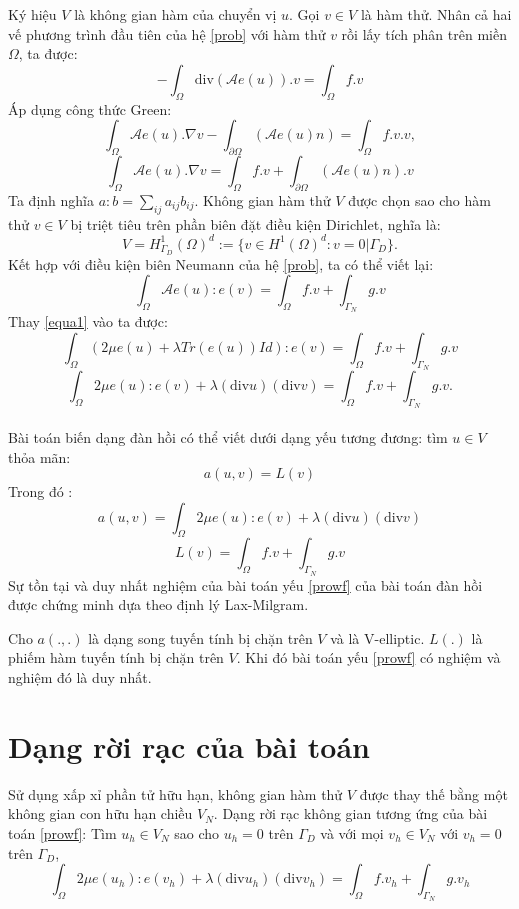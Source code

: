 Ký hiệu $V$ là không gian hàm của chuyển vị $u$. Gọi $v \in V$ là hàm thử. Nhân cả hai vế phương trình đầu tiên của hệ \eqref{prob} với hàm thử $v$ rồi lấy tích phân trên miền $\Omega$, ta được:
$$-\int_\Omega\text{div}(\mathcal{A}e(u)).v = \int_\Omega f.v$$
Áp dụng công thức Green:
$$\int_\Omega\mathcal{A}e(u).\nabla v - \int_{\partial \Omega}(\mathcal{A}e(u)n) = \int_\Omega f.v.v,$$
$$\int_\Omega\mathcal{A}e(u).\nabla v = \int_\Omega f.v + \int_{\partial \Omega}(\mathcal{A}e(u)n).v$$
Ta định nghĩa $a : b = \sum_{ij}{a_{ij}b_{ij}}.$ Không gian hàm thử $V$ được chọn sao cho hàm thử $v \in V$ bị triệt tiêu trên phần biên đặt điều kiện Dirichlet, nghĩa là:
$$V = H^1_{\Gamma_D}(\Omega)^d := \{v \in H^1(\Omega)^d : v = 0|\Gamma_D\}.$$
Kết hợp với điều kiện biên Neumann của hệ \eqref{prob}, ta có thể viết lại:
$$\int_\Omega\mathcal{A}e(u):e(v) = \int_\Omega f.v + \int_{\Gamma_N}g.v$$
Thay \eqref{equa1} vào ta được:
$$\int_\Omega(2\mu e(u) + \lambda Tr(e(u))Id):e(v) = \int_\Omega f.v + \int_{\Gamma_N}g.v$$
$$\int_\Omega 2\mu e(u) : e(v) + \lambda(\text{div}u)(\text{div}v) = \int_\Omega f.v + \int_{\Gamma_N}g.v.$$\\
Bài toán biến dạng đàn hồi có thể viết dưới dạng yếu tương đương: tìm $u\in V$ thỏa mãn:
\begin{equation}\label{prowf}
a(u,v) = L(v)
\end{equation}
Trong đó :
$$a(u,v) = \int_\Omega 2\mu e(u) : e(v) + \lambda(\text{div}u)(\text{div}v)$$
$$L(v) = \int_\Omega f.v + \int_{\Gamma_N}g.v$$
Sự tồn tại và duy nhất nghiệm của bài toán yếu \ref{prowf} của bài toán đàn hồi được chứng minh dựa theo định lý Lax-Milgram.
\begin{thm}\label{thm:chap1_reducedVariationalForm}
Cho $a(.,.)$ là dạng song tuyến tính bị chặn trên $V$ và là V-elliptic. $L(.)$ là phiếm hàm tuyến tính bị chặn trên $V$. Khi đó bài toán yếu \ref{prowf} có nghiệm và nghiệm đó là duy nhất.
\end{thm}
\section{Dạng rời rạc của bài toán}
Sử dụng xấp xỉ phần tử hữu hạn, không gian hàm thử $V$ được thay thế bằng một không gian con hữu hạn chiều $V_N$. Dạng rời rạc không gian tương ứng của bài toán \ref{prowf}: Tìm $u_h \in V_N$
sao cho $u_h = 0$ trên $\Gamma_D$ và với mọi $v_h \in V_N$ với $v_h = 0$ trên $\Gamma_D$,
\begin{equation}\label{prod}
\int_\Omega 2\mu e(u_h) : e(v_h) + \lambda(\text{div}u_h)(\text{div}v_h) = \int_\Omega f.v_h + \int_{\Gamma_N}g.v_h
\end{equation}
